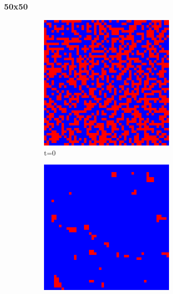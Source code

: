 \documentclass[a4paper, 11pt]{article}
\begin{document}
\subsubsection{50x50}
\begin{figure}[H]
\centering
\begin{subfigure}{.33\textwidth}
  \centering
  \includegraphics[width=0.9\linewidth]{PRISONERS_DILEMMA_MOORE_50x50_t00}
  \caption{t=0}
\end{subfigure}%
\begin{subfigure}{.33\textwidth}
  \centering
  \includegraphics[width=0.9\linewidth]{PRISONERS_DILEMMA_MOORE_50x50_t01}

\end{subfigure}
\end{figure}
\end{document}
